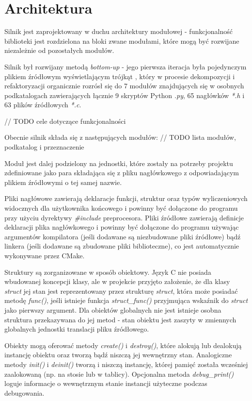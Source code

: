 \section{Architektura}

Silnik jest zaprojektowany w duchu architektury modułowej - funkcjonalność biblioteki jest rozdzielona na bloki zwane modułami, które mogą być rozwijane niezależnie od pozostałych modułów.

Silnik był rozwijany metodą \textit{bottom-up} - jego pierwsza iteracja była pojedynczym plikiem źródłowym wyświetlającym trójkąt \cite{VULKANTUTORIAL}, który w procesie dekompozycji i refaktoryzacji organicznie rozrósł się do 7 modułów znajdujących się w osobnych podkatalogach zawierających łącznie 9 skryptów Python \textit{.py}, 65 nagłówków \textit{*.h} i 63 plików źródłowych \textit{*.c}.

// TODO cele dotyczące funkcjonalności

Obecnie silnik składa się z następujących modułów:
// TODO lista modułów, podkatalog i przeznaczenie

Moduł jest dalej podzielony na jednostki, które zostały na potrzeby projektu zdefiniowane jako para składająca się z pliku nagłówkowego z odpowiadającym plikiem źródłowymi o tej samej nazwie.

Pliki nagłówowe zawierają deklaracje funkcji, struktur oraz typów wyliczeniowych widocznych dla użytkownika końcowego i powinny być dołączone do programu przy użyciu dyrektywy \textit{\#include} preprocesora.
Pliki źródłowe zawierają definicje deklaracji plika nagłówkowego i powinny być dołączone do programu używając argumentów kompilatora (jeśli dodawane są niezbudowane pliki źródłowe) bądź linkera (jeśli dodawane są zbudowane pliki biblioteczne), co jest automatycznie wykonywane przez CMake.

Struktury są zorganizowane w sposób obiektowy.
Język C nie posiada wbudowanej koncepcji klasy, ale w projekcie przyjęto założenie, że dla klasy \textit{struct} jej stan jest reprezentowany przez strukturę \textit{struct}, która może posiadać metodę \textit{func()}, jeśli istnieje funkcja \textit{struct\_func()} przyjmująca wskaźnik do \textit{struct} jako pierwszy argument.
Dla obiektów globalnych nie jest istnieje osobna struktura przekazywana do jej metod - stan obiektu jest zaszyty w zmiennych globalnych jednostki translacji pliku źródłowego.

Obiekty mogą oferować metody \textit{create()} i \textit{destroy()}, które alokują lub dealokują instancję obiektu oraz tworzą bądź niszczą jej wewnętrzny stan.
Analogiczne metody \textit{init()} i \textit{deinit()} tworzą i niszczą instancję, której pamięć została wcześniej zaalokowaną (np. na stosie lub w tablicy).
Opcjonalna metoda \textit{debug\_print()} loguje informacje o wewnętrznym stanie instancji użyteczne podczas debugowania.

